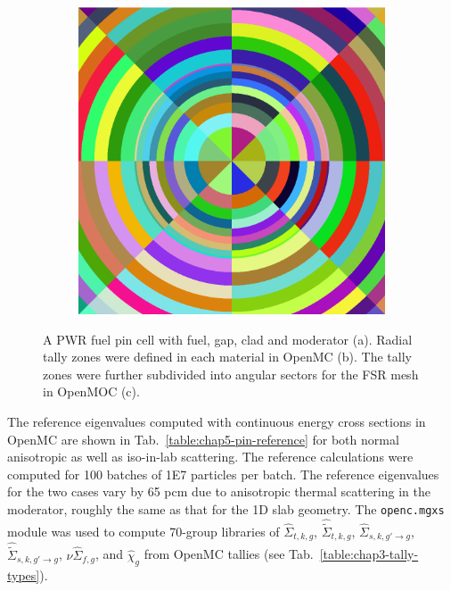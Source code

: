 \begin{figure}[H]
\begin{subfigure}{.32\textwidth}
  \caption{}
  \label{fig:chap5-pin-b}
\end{subfigure}
\begin{subfigure}{.32\textwidth}
  \centering
  \includegraphics[width=0.9\linewidth]{figures/biases/pin-cell/pin-cell-8x8}
  \caption{}
  \label{fig:chap5-pin-c}
\end{subfigure}
\caption[Pin cell materials and geometry]{A PWR fuel pin cell with fuel, gap, clad and moderator (a). Radial tally zones were defined in each material in OpenMC (b). The tally zones were further subdivided into angular sectors for the \ac{FSR} mesh in OpenMOC (c).}
\label{fig:chap5-pin-cell}
\end{figure}

The reference eigenvalues computed with continuous energy cross sections in OpenMC are shown in Tab.~\ref{table:chap5-pin-reference} for both normal anisotropic as well as iso-in-lab scattering. The reference calculations were computed for 100 batches of 1E7 particles per batch. The reference eigenvalues for the two cases vary by 65 \ac{pcm} due to anisotropic thermal scattering in the moderator, roughly the same as that for the 1D slab geometry. The \texttt{openc.mgxs} module was used to compute 70-group libraries of $\hat{\Sigma}_{t,k,g}$, $\hat{\tilde{\Sigma}}_{t,k,g}$, $\hat{\Sigma}_{s,k,g'\rightarrow g}$, $\hat{\tilde{\Sigma}}_{s,k,g'\rightarrow g}$, $\nu\hat{\Sigma}_{f,g}$, and $\hat{\chi}_{g}$ from OpenMC tallies (see Tab.~\ref{table:chap3-tally-types}). 


